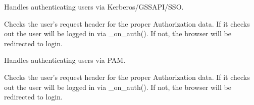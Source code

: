 \documentclass[letterpaper,10pt,openany]{sphinxmanual}
\begin{document}
\begin{fulllineitems}
\label{Developer/authentication:gateone.auth.authentication.KerberosAuthHandler}
Handles authenticating users via Kerberos/GSSAPI/SSO.

\begin{fulllineitems}
\label{Developer/authentication:gateone.auth.authentication.KerberosAuthHandler.get}
Checks the user's request header for the proper Authorization data.
If it checks out the user will be logged in via \_on\_auth().  If not,
the browser will be redirected to login.

\end{fulllineitems}


\end{fulllineitems}


\begin{fulllineitems}
\label{Developer/authentication:gateone.auth.authentication.PAMAuthHandler}
Handles authenticating users via PAM.

\begin{fulllineitems}
\label{Developer/authentication:gateone.auth.authentication.PAMAuthHandler.get}
Checks the user's request header for the proper Authorization data.
If it checks out the user will be logged in via \_on\_auth().  If not,
the browser will be redirected to login.

\end{fulllineitems}


\end{fulllineitems}

\end{document}
